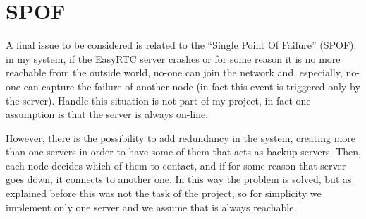 \section{SPOF}
A final issue to be considered is related to the ``Single Point Of Failure'' (SPOF): in my system, if the EasyRTC server crashes or for some reason it is no more reachable from the outside world, no-one can join the network and, especially, no-one can capture the failure of another node (in fact this event is triggered only by the server). Handle this situation is not part of my project, in fact one assumption is that the server is always on-line. 

However, there is the possibility to add redundancy in the system, creating more than one servers in order to have some of them that acts as backup servers. Then, each node decides which of them to contact, and if for some reason that server goes down, it connects to another one. In this way the problem is solved, but as explained before this was not the task of the project, so for simplicity we implement only one server and we assume that is always reachable.
